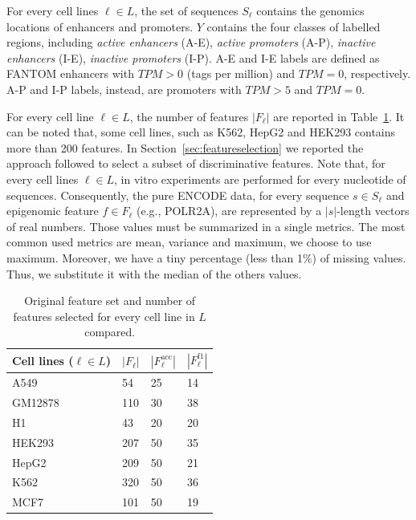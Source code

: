 For every cell lines $\ell \in L$, the set of sequences $S_\ell$ contains the genomics locations of enhancers and promoters. $Y$ contains the four classes of labelled regions, including \emph{active enhancers} (A-E), \emph{active promoters} (A-P), \emph{inactive enhancers} (I-E), \emph{inactive promoters} (I-P). A-E and I-E labels are defined as FANTOM enhancers with $TPM>0$ (tags per million) and $TPM=0$, respectively. A-P and I-P labels, instead, are promoters with $TPM>5$ and $TPM=0$. 

For every cell line $\ell \in L$, the number of features $| F_\ell |$ are reported in Table~\ref{tab:featuressize}. It can be noted that, some cell lines, such as K562, HepG2 and HEK293 contains more than 200 features. In Section~\ref{sec:featureselection} we reported the approach followed to select a subset of discriminative features.
Note that, for every cell lines $\ell \in L$, in vitro experiments are
performed for every nucleotide of sequences. Consequently, the pure ENCODE
data, for every sequence $s \in S_\ell$ and epigenomic feature $f \in
F_\ell$ (e.g., POLR2A), are represented by a $|s|$-length vectors of real
numbers. Those values must be summarized in a single metrics. The most
common used metrics are mean, variance and maximum, we choose to use
maximum. Moreover, we have a tiny percentage (less than 1\%) of
missing values. Thus, we substitute it with the median of the others values.
\begin{table}[t]
\centering
\begin{tabular}{llll}
\toprule
Cell lines ($\ell \in L$) & $|F_\ell|$ & $|F_\ell^{\textrm{acc}}|$ & $|F_\ell^{\textrm{f1}}|$ \\
\midrule
A549               & 54 & 25 & 14                  \\ 
GM12878            & 110 & 30 & 38                 \\ 
H1                 & 43 & 20 & 20                  \\ 
HEK293             & 207 & 50 & 35                 \\ 
HepG2              & 209 & 50 & 21                 \\ 
K562               & 320 & 50 & 36                 \\ 
MCF7               & 101 & 50 & 19                 \\ 
\bottomrule
\end{tabular}
\caption{Original feature set and number of features selected for every cell line in $L$ compared.}
\label{tab:featuressize}
\end{table}
